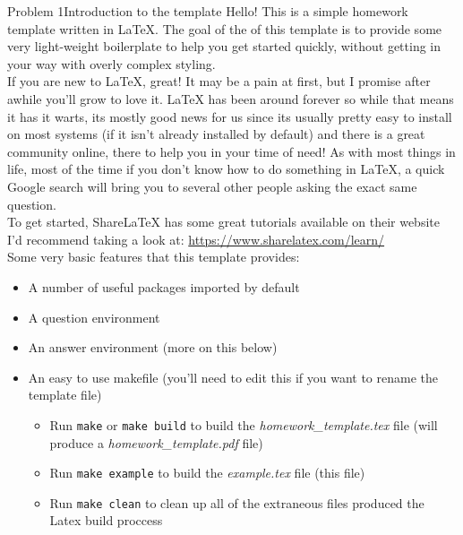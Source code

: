 \documentclass[11pt]{article}
\begin{document}
\begin{question}{Problem 1}{Introduction to the template}
  Hello! This is a simple homework template written in \LaTeX. The goal of the
  of this template is to provide some very light-weight boilerplate to help you
  get started quickly, without getting in your way with overly complex
  styling.\\

  If you are new to LaTeX, great! It may be a pain at first, but I promise
  after awhile you'll grow to love it. LaTeX has been around forever so while
  that means it has it warts, its mostly good news for us since its usually
  pretty easy to install on most systems (if it isn't already installed by
  default) and there is a great community online, there to help you in your
  time of need! As with most things in life, most of the time if you don't know how
  to do something in LaTeX, a quick Google search will bring you to several
  other people asking the exact same question.\\

  To get started, ShareLaTeX has some great tutorials available on their
  website I'd recommend taking a look at:
  \url{https://www.sharelatex.com/learn/}\\

  Some very basic features that this template provides:
  \begin{itemize}
  \item A number of useful packages imported by default
  \item A question environment
  \item An answer environment (more on this below)
  \item An easy to use makefile (you'll need to edit this if you want to rename
    the template file)
    \begin{itemize}
    \item Run \texttt{make} or \texttt{make build} to build the \textit{homework\_template.tex} file
      (will produce a \textit{homework\_template.pdf} file)
    \item Run \texttt{make example} to build the \textit{example.tex} file (this
      file)
    \item Run \texttt{make clean} to clean up all of the extraneous files
      produced the Latex build proccess
    \end{itemize}
  \end{itemize}
\end{question}
\end{document}
